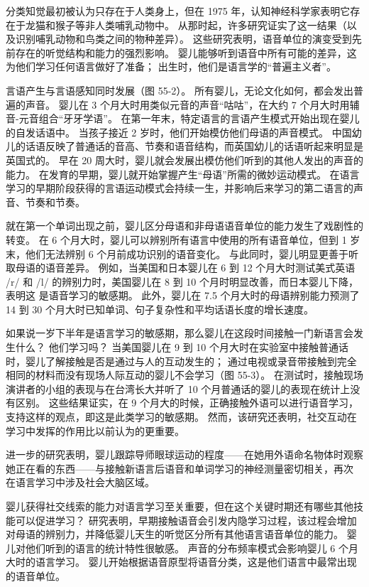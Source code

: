 分类知觉最初被认为只存在于人类身上，但在 1975 年，认知神经科学家表明它存在于龙猫和猴子等非人类哺乳动物中。 从那时起，许多研究证实了这一结果（以及识别哺乳动物和鸟类之间的物种差异）。 这些研究表明，语音单位的演变受到先前存在的听觉结构和能力的强烈影响。 婴儿能够听到语音中所有可能的差异，这为他们学习任何语言做好了准备； 出生时，他们是语言学的“普遍主义者”。

言语产生与言语感知同时发展（图 55-2）。 所有婴儿，无论文化如何，都会发出普遍的声音。 婴儿在 3 个月大时用类似元音的声音“咕咕”，在大约 7 个月大时用辅音-元音组合“牙牙学语”。 在第一年末，特定语言的言语产生模式开始出现在婴儿的自发话语中。 当孩子接近 2 岁时，他们开始模仿他们母语的声音模式。 中国幼儿的话语反映了普通话的音高、节奏和语音结构，而英国幼儿的话语听起来明显是英国式的。 早在 20 周大时，婴儿就会发展出模仿他们听到的其他人发出的声音的能力。 在发育的早期，婴儿就开始掌握产生“母语”所需的微妙运动模式。 在语言学习的早期阶段获得的言语运动模式会持续一生，并影响后来学习的第二语言的声音、节奏和节奏。

就在第一个单词出现之前，婴儿区分母语和非母语语音单位的能力发生了戏剧性的转变。 在 6 个月大时，婴儿可以辨别所有语言中使用的所有语音单位，但到 1 岁末，他们无法辨别 6 个月前成功识别的语音变化。 与此同时，婴儿明显更善于听取母语的语音差异。 例如，当美国和日本婴儿在 6 到 12 个月大时测试美式英语 /r/ 和 /l/ 的辨别力时，美国婴儿在 8 到 10 个月时明显改善，而日本婴儿下降，表明这 是语音学习的敏感期。 此外，婴儿在 7.5 个月大时的母语辨别能力预测了 14 到 30 个月大时已知单词、句子复杂性和平均话语长度的增长速度。

如果说一岁下半年是语言学习的敏感期，那么婴儿在这段时间接触一门新语言会发生什么？ 他们学习吗？ 当美国婴儿在 9 到 10 个月大时在实验室中接触普通话时，婴儿了解接触是否是通过与人的互动发生的； 通过电视或录音带接触到完全相同的材料而没有现场人际互动的婴儿不会学习（图 55-3）。 在测试时，接触现场演讲者的小组的表现与在台湾长大并听了 10 个月普通话的婴儿的表现在统计上没有区别。 这些结果证实，在 9 个月大的时候，正确接触外语可以进行语音学习，支持这样的观点，即这是此类学习的敏感期。 然而，该研究还表明，社交互动在学习中发挥的作用比以前认为的更重要。

进一步的研究表明，婴儿跟踪导师眼球运动的程度——在她用外语命名物体时观察她正在看的东西——与接触新语言后语音和单词学习的神经测量密切相关，再次 在语言学习中涉及社会大脑区域。

婴儿获得社交线索的能力对语言学习至关重要，但在这个关键时期还有哪些其他技能可以促进学习？ 研究表明，早期接触语音会引发内隐学习过程，该过程会增加对母语的辨别力，并降低婴儿天生的听觉区分所有其他语言语音单位的能力。 婴儿对他们听到的语言的统计特性很敏感。 声音的分布频率模式会影响婴儿 6 个月大时的语言学习。 婴儿开始根据语音原型将语音分类，这是他们语言中最常出现的语音单位。


